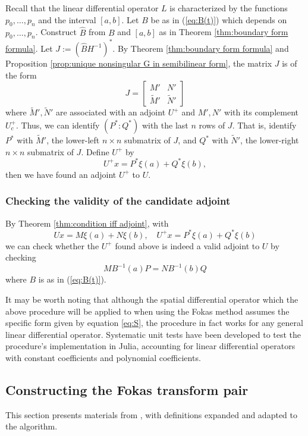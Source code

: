\documentclass[12pt, oneside, a4paper]{article}
\begin{document}
Recall that the linear differential operator $L$ is characterized by the functions $p_0,\ldots,p_n$ and the interval $[a,b]$. Let $B$ be as in (\ref{eq:B(t)}) which depends on $p_0,\ldots,p_n$. Construct $\hat{B}$ from $B$ and $[a,b]$ as in Theorem \ref{thm:boundary form formula}. Let $J:=(\hat{B}H^{-1})^*$. By Theorem \ref{thm:boundary form formula} and Proposition \ref{prop:unique nonsingular G in semibilinear form}, the matrix $J$ is of the form
\[J=\begin{bmatrix}M' & N'\\ \tilde{M}' & \tilde{N}'\end{bmatrix}\]
where $\tilde{M}', \tilde{N}'$ are associated with an adjoint $U^+$ and $M', N'$ with its complement $U_c^+$.
Thus, we can identify $(P^*:Q^*)$ with the last $n$ rows of $J$. That is, identify $P^*$ with $\tilde{M}'$, the lower-left $n\times n$ submatrix of $J$, and $Q^*$ with $\tilde{N}'$, the lower-right $n\times n$ submatrix of $J$. Define $U^+$ by
\[U^+x = P^* \xi(a) + Q^* \xi(b),\]
then we have found an adjoint $U^+$ to $U$.

\subsubsection{Checking the validity of the candidate adjoint}
By Theorem \ref{thm:condition iff adjoint}, with
\begin{equation}\label{eq:adjointU}
    Ux = M\xi(a) + N\xi(b),\quad U^+x = P^* \xi(a) + Q^* \xi(b)
\end{equation}
we can check whether the $U^+$ found above is indeed a valid adjoint to $U$ by checking 
\[MB^{-1}(a)P = NB^{-1}(b)Q\]
where $B$ is as in (\ref{eq:B(t)}).

It may be worth noting that although the spatial differential operator which the above procedure will be applied to when using the Fokas method assumes the specific form given by equation \eqref{eq:S}, the procedure in fact works for any general linear differential operator. Systematic unit tests have been developed \cite{Xiao} to test the procedure's implementation in Julia, accounting for linear differential operators with constant coefficients and polynomial coefficients.

\subsection{Constructing the Fokas transform pair}\label{sec:fokas_transform_pair}

This section presents materials from \cite{Smith2016}, with definitions expanded and adapted to the algorithm.
\end{document}
